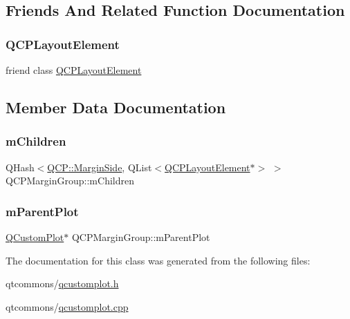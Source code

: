 \subsection{Friends And Related Function Documentation}
\mbox{\label{class_q_c_p_margin_group_a0790750c7e7f14fdbd960d172655b42b}} 
\subsubsection{\texorpdfstring{QCPLayoutElement}{QCPLayoutElement}}
{\footnotesize\ttfamily friend class \mbox{\hyperlink{class_q_c_p_layout_element}{Q\+C\+P\+Layout\+Element}}\hspace{0.3cm}{\ttfamily [friend]}}



\subsection{Member Data Documentation}
\mbox{\label{class_q_c_p_margin_group_a954bc89ff8958b9bb6a4a0d08ed5fc0f}} 
\subsubsection{\texorpdfstring{mChildren}{mChildren}}
{\footnotesize\ttfamily Q\+Hash$<$\mbox{\hyperlink{namespace_q_c_p_a7e487e3e2ccb62ab7771065bab7cae54}{Q\+C\+P\+::\+Margin\+Side}}, Q\+List$<$\mbox{\hyperlink{class_q_c_p_layout_element}{Q\+C\+P\+Layout\+Element}}$\ast$$>$ $>$ Q\+C\+P\+Margin\+Group\+::m\+Children\hspace{0.3cm}{\ttfamily [protected]}}

\mbox{\label{class_q_c_p_margin_group_a23cfa29e3cc0f33a59141b77d8c04edf}} 
\subsubsection{\texorpdfstring{mParentPlot}{mParentPlot}}
{\footnotesize\ttfamily \mbox{\hyperlink{class_q_custom_plot}{Q\+Custom\+Plot}}$\ast$ Q\+C\+P\+Margin\+Group\+::m\+Parent\+Plot\hspace{0.3cm}{\ttfamily [protected]}}



The documentation for this class was generated from the following files\+:\begin{DoxyCompactItemize}
\item 
qtcommons/\mbox{\hyperlink{qcustomplot_8h}{qcustomplot.\+h}}\item 
qtcommons/\mbox{\hyperlink{qcustomplot_8cpp}{qcustomplot.\+cpp}}\end{DoxyCompactItemize}
